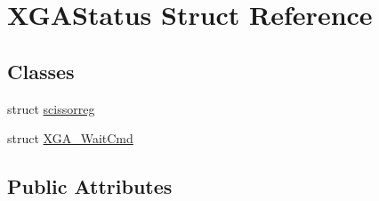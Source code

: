 \hypertarget{structXGAStatus}{\section{X\-G\-A\-Status Struct Reference}
\label{structXGAStatus}
}
\subsection*{Classes}
\begin{DoxyCompactItemize}
\item 
struct \hyperlink{structXGAStatus_1_1scissorreg}{scissorreg}
\item 
struct \hyperlink{structXGAStatus_1_1XGA__WaitCmd}{X\-G\-A\-\_\-\-Wait\-Cmd}
\end{DoxyCompactItemize}
\subsection*{Public Attributes}
